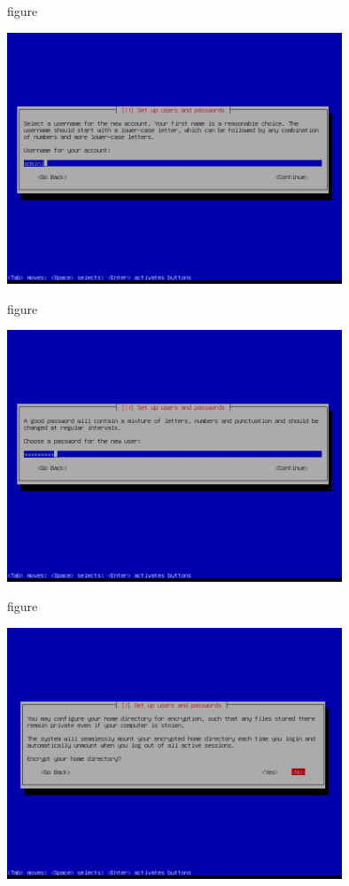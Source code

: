 \begin{nofloat}{figure}
\begin{center}
\includegraphics[width=0.75\textwidth]{screenshots/29_ubuntu_install.png}
\end{center}
\end{nofloat}


\begin{nofloat}{figure}
\begin{center}
\includegraphics[width=0.75\textwidth]{screenshots/30_ubuntu_install.png}
\end{center}
\end{nofloat}


\begin{nofloat}{figure}
\begin{center}
\includegraphics[width=0.75\textwidth]{screenshots/31_ubuntu_install.png}
\end{center}
\end{nofloat}


